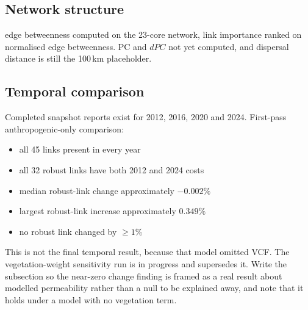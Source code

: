 \subsection{Network structure}
\label{sec:graph}

\begin{outline}
edge betweenness computed on the 23-core network, link
importance ranked on normalised edge betweenness. PC and $dPC$ not yet computed, and
dispersal distance is still the 100\,km placeholder.
\end{outline}

\subsection{Temporal comparison}
\label{sec:temporal}

\begin{outline}
Completed snapshot reports exist for 2012, 2016, 2020 and
2024. First-pass anthropogenic-only comparison:
\begin{itemize}
  \item all 45 links present in every year
  \item all 32 robust links have both 2012 and 2024 costs
  \item median robust-link change approximately $-0.002\%$
  \item largest robust-link increase approximately $0.349\%$
  \item no robust link changed by $\ge 1\%$
\end{itemize}
This is not the final temporal result, because that model omitted VCF. The
vegetation-weight sensitivity run is in progress and supersedes it. Write the
subsection so the near-zero change finding is framed as a real result about modelled
permeability rather than a null to be explained away, and note that it holds under a
model with no vegetation term.
\end{outline}

